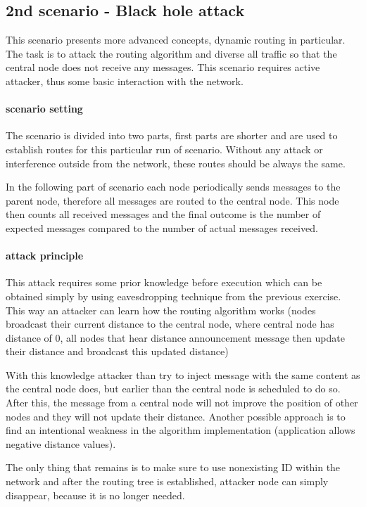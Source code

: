 \documentclass[
  print, %
  Table,   %
  nolof,     %
  nolot,     %
           oneside
]{fithesis3}
\begin{document}
    \subsection{2nd scenario - Black hole attack} \label{subsec:2nd}
    This scenario presents more advanced concepts, dynamic routing in particular. The task is to attack the routing algorithm and diverse all traffic so that the central node does not receive any messages. This scenario requires active attacker, thus some basic interaction with the network.

    \paragraph{scenario setting}
    The scenario is divided into two parts, first parts are shorter and are used to establish routes for this particular run of scenario. Without any attack or interference outside from the network, these routes should be always the same.

    In the following part of scenario each node periodically sends messages to the parent node, therefore all messages are routed to the central node. This node then counts all received messages and the final outcome is the number of expected messages compared to the number of actual messages received.

    \paragraph{attack principle}
    This attack requires some prior knowledge before execution which can be obtained simply by using eavesdropping technique from the previous exercise. This way an attacker can learn how the routing algorithm works (nodes broadcast their current distance to the central node, where central node has distance of 0, all nodes that hear distance announcement message then update their distance and broadcast this updated distance)

    With this knowledge attacker than try to inject message with the same content as the central node does, but earlier than the central node is scheduled to do so. After this, the message from a central node will not improve the position of other nodes and they will not update their distance. Another possible approach is to find an intentional weakness in the algorithm implementation (application allows negative distance values).

    The only thing that remains is to make sure to use nonexisting ID within the network and after the routing tree is established, attacker node can simply disappear, because it is no longer needed.
\end{document}
